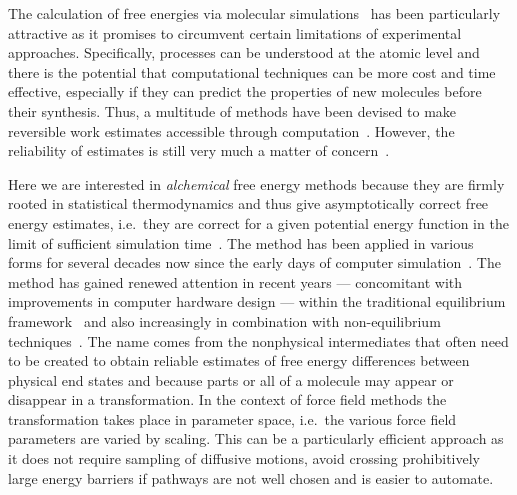 \documentclass[journal=jctcce,manuscript=article]{achemso}
\begin{document}
The calculation of free energies via molecular 
simulations~\cite{hansen_practical_2014, doi:10.1021/jp102971x,
  Gallicchio201127, doi:10.1080/08927022.2015.1132317,
  doi:10.1146/annurev.matsci.32.111901.153708} has been particularly
attractive as it promises to circumvent certain limitations of experimental
approaches. Specifically, processes can be understood at the atomic level and there is the potential that computational techniques can be 
more cost and time effective, especially if they can predict the properties of new molecules before their synthesis.  
Thus, a multitude of methods have been devised
 to make reversible work estimates accessible through 
computation~\cite{hansen_practical_2014,
  doi:10.1021/jp102971x, Gallicchio201127,
  doi:10.1080/08927022.2015.1132317,
  doi:10.1146/annurev.matsci.32.111901.153708}.  However, the
reliability of estimates is still very much a matter of
concern~\cite{doi:10.1021/jp102971x, doi:10.1021/acs.jctc.5b00179}.

Here we are interested in \emph{alchemical} free energy methods because they 
are firmly rooted in statistical thermodynamics and thus give asymptotically 
correct free energy estimates, i.e.\ they are correct for a given potential 
energy function in the limit of sufficient simulation 
time~\cite{Beveridge-citeulike:3789890, straatsma:92, doi:10.1021/cr00023a004, 
hansen_practical_2014}.  The method has been applied in various forms for 
several decades now since the early days of computer 
simulation~\cite{doi:10.1063/1.1671118, bennett_efficient_1976, 
doi:10.1063/1.432264, FS9821700055,  Tembe1984281, doi:10.1063/1.449208}.  The 
method has gained renewed attention in recent years --- concomitant with 
improvements in computer hardware design --- within the traditional equilibrium
framework~\cite{GILSON19971047, doi:10.1021/jp0217839, deng_computations_2009} 
and also increasingly in combination with non-equilibrium 
techniques~\cite{ytreberg_comparison_2006, JCC:JCC23804,
  doi:10.1021/ct500964e}.  The name comes from the nonphysical
intermediates that often need to be created to obtain reliable estimates of 
free energy differences between physical end states and because parts or 
all of a molecule may appear or disappear in a transformation.  In the 
context of force field methods the transformation takes place in parameter 
space, i.e.\ the various force field parameters are varied by scaling.  This 
can be a particularly efficient approach as it does not require sampling of 
diffusive motions, avoid crossing prohibitively large energy barriers if 
pathways are not well chosen and is easier to automate.
\end{document}
